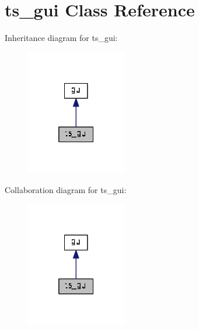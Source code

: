 \hypertarget{classts__gui}{}\section{ts\+\_\+gui Class Reference}
\label{classts__gui}


Inheritance diagram for ts\+\_\+gui\+:\nopagebreak
\begin{figure}[H]
\begin{center}
\leavevmode
\includegraphics[width=124pt]{classts__gui__inherit__graph}
\end{center}
\end{figure}


Collaboration diagram for ts\+\_\+gui\+:\nopagebreak
\begin{figure}[H]
\begin{center}
\leavevmode
\includegraphics[width=124pt]{classts__gui__coll__graph}
\end{center}
\end{figure}
